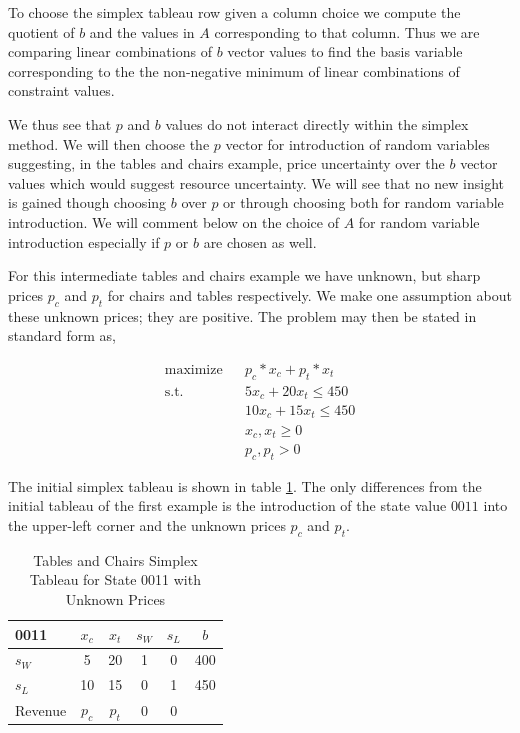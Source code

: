 To choose the simplex tableau row given a column choice we compute the
quotient of $b$ and the values in $A$ corresponding to that
column. Thus we are comparing linear combinations of $b$ vector
values to find the basis variable corresponding to the the non-negative
minimum of linear combinations of constraint values.

We thus see that $p$ and $b$ values do not interact directly within
the simplex method. We will then choose the $p$ vector for
introduction of random variables suggesting, in the tables and chairs
example, price uncertainty over the $b$ vector values which would
suggest resource uncertainty. We will see that no new insight is
gained though choosing $b$ over $p$ or through choosing both for
random variable introduction. We will comment below on the choice of
$A$ for random variable introduction especially if $p$ or $b$ are
chosen as well. 

For this intermediate tables and chairs example we have unknown, but
sharp prices $p_c$ and $p_t$ for chairs and tables respectively. We
make one assumption about these unknown prices; they are positive. The
problem may then be stated in standard form as,

\begin{align*}
\text{maximize} && p_c * x_c + p_t * x_t\\
\text{s.t.}     && 5 x_c + 20 x_t \le 450\\
                && 10 x_c + 15 x_t \le 450\\
                && x_c, x_t \ge 0\\
                && p_c, p_t > 0
\end{align*}

The initial simplex tableau is shown in table \ref{tab:tcp0011}. The
only differences from the initial tableau of the first example is the
introduction of the state value $0011$ into the upper-left corner and
the unknown prices $p_c$ and $p_t$.

\begin{table}
\centering
\begin{tabular}{| l | c c c c | c |}
\hline
0011    & $x_c$ & $x_t$ & $s_W$ & $s_L$ & $b$\\
\hline
$s_W$   & 5     & 20    & 1     & 0     & 400\\
$s_L$   & 10    & 15    & 0     & 1     & 450\\
\hline
Revenue & $p_c$ & $p_t$ & 0     & 0     &\\
\hline
\end{tabular}
  \caption[Tables and Chairs Simplex Tableau for State 0011 with Unknown Prices]
          {Tables and Chairs Simplex Tableau for State 0011 with Unknown Prices}
  \label{tab:tcp0011}
\end{table}

